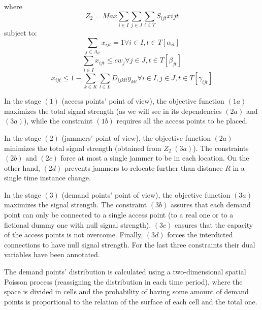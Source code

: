 \documentclass[runningheads]{llncs}
\begin{document}
where
\begin{equation}\tag{3a}
\label{Eq3a}
    Z_2 = Max \sum_{i \in I} \sum_{j \in J} \sum_{t \in T} S_{ijt} x{ijt}
\end{equation}
subject to:
\begin{equation}\tag{3b}
    \sum_{j \in A_{it}} x_{ijt} = 1 \forall i \in I, t \in T [\alpha_{it}]
\end{equation}
\begin{equation}\tag{3c}
    \sum_{i \in I} x_{ijt} \leq cw_j \forall j \in J, t \in T [\beta_{jt}]
\end{equation}
\begin{equation}\tag{3d}
    x_{ijt} \leq 1 - \sum_{k \in K} \sum_{l \in L} D_{ijklt} y_{klt} \forall i \in I, j \in J, t \in T [\gamma_{ijt}]
\end{equation}
\normalsize

In the stage $(1)$ (access points' point of view), the objective function $(1a)$ maximizes the total signal strength (as we will see in its dependencies $(2a)$ and $(3a)$), while the constraint $(1b)$ requires all the access points to be placed.

In the stage $(2)$ (jammers' point of view), the objective function $(2a)$ minimizes the total signal strength (obtained from $Z_2 \; (3a)$). The constraints $(2b)$ and $(2c)$ force at most a single jammer to be in each location. On the other hand, $(2d)$ prevents jammers to relocate further than distance $R$ in a single time instance change.

In the stage $(3)$ (demand points' point of view), the objective function $(3a)$ maximizes the signal strength. The constraint $(3b)$ assures that each demand point can only be connected to a single access point (to a real one or to a fictional dummy one with null signal strength). $(3c)$ ensures that the capacity of the access points is not overcome. Finally, $(3d)$ forces the interdicted connections to have null signal strength. For the last three constraints their dual variables have been annotated.

The demand points' distribution is calculated using a two-dimensional spatial Poisson process (reassigning the distribution in each time period), where the space is divided in cells and the probability of having some amount of demand points is proportional to the relation of the surface of each cell and the total one.
\end{document}
